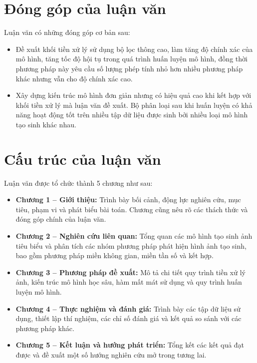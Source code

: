 \section{Đóng góp của luận văn}
Luận văn có những đóng góp cơ bản sau:
\begin{itemize}
	\item Đề xuất khối tiền xử lý sử dụng bộ lọc thông cao, làm tăng độ chính xác của mô hình, tăng tốc độ hội tụ trong quá trình huấn luyện mô hình, đồng thời phương pháp này yêu cầu số lượng phép tính nhỏ hơn nhiều phương pháp khác nhưng vẫn cho độ chính xác cao.
	\item Xây dựng kiến trúc mô hình đơn giản nhưng có hiệu quả cao khi kết hợp với khối tiền xử lý mà luận văn đề xuất. Bộ phân loại sau khi huấn luyện có khả năng hoạt động tốt trên nhiều tập dữ liệu được sinh bởi nhiều loại mô hình tạo sinh khác nhau.

\end{itemize}

\section{Cấu trúc của luận văn}

Luận văn được tổ chức thành 5 chương như sau:

\begin{itemize}
	\item \textbf{Chương 1 – Giới thiệu:} Trình bày bối cảnh, động lực nghiên cứu, mục tiêu, phạm vi và phát biểu bài toán. Chương cũng nêu rõ các thách thức và đóng góp chính của luận văn.
	
	\item \textbf{Chương 2 – Nghiên cứu liên quan:} Tổng quan các mô hình tạo sinh ảnh tiêu biểu và phân tích các nhóm phương pháp phát hiện hình ảnh tạo sinh, bao gồm phương pháp miền không gian, miền tần số và kết hợp.
	
	\item \textbf{Chương 3 – Phương pháp đề xuất:} Mô tả chi tiết quy trình tiền xử lý ảnh, kiến trúc mô hình học sâu, hàm mất mát sử dụng và quy trình huấn luyện mô hình.
	
	\item \textbf{Chương 4 – Thực nghiệm và đánh giá:} Trình bày các tập dữ liệu sử dụng, thiết lập thí nghiệm, các chỉ số đánh giá và kết quả so sánh với các phương pháp khác.
	
	\item \textbf{Chương 5 – Kết luận và hướng phát triển:} Tổng kết các kết quả đạt được và đề xuất một số hướng nghiên cứu mở trong tương lai.
\end{itemize}









